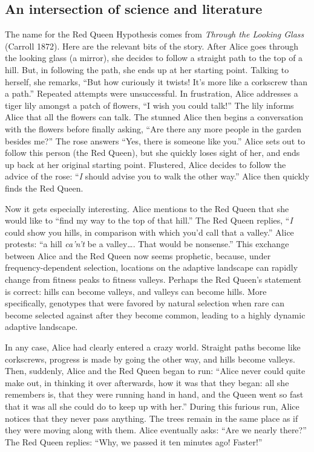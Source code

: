 \documentclass[
  letterpaper,
]{book}
\begin{document}
\subsection{An intersection of science and
literature}\label{an-intersection-of-science-and-literature}

The name for the Red Queen Hypothesis comes from \emph{Through the
Looking Glass} (Carroll 1872). Here are the relevant bits of the story.
After Alice goes through the looking glass (a mirror), she decides to
follow a straight path to the top of a hill. But, in following the path,
she ends up at her starting point. Talking to herself, she remarks,
``But how curiously it twists! It's more like a corkscrew than a path.''
Repeated attempts were unsuccessful. In frustration, Alice addresses a
tiger lily amongst a patch of flowers, ``I wish you could talk!'' The
lily informs Alice that all the flowers can talk. The stunned Alice then
begins a conversation with the flowers before finally asking, ``Are
there any more people in the garden besides me?'' The rose answers
``Yes, there is someone like you.'' Alice sets out to follow this person
(the Red Queen), but she quickly loses sight of her, and ends up back at
her original starting point. Flustered, Alice decides to follow the
advice of the rose: ``\emph{I} should advise you to walk the other
way.'' Alice then quickly finds the Red Queen.

Now it gets especially interesting. Alice mentions to the Red Queen that
she would like to ``find my way to the top of that hill.'' The Red Queen
replies, ``\emph{I} could show you hills, in comparison with which you'd
call that a valley.'' Alice protests: ``a hill \emph{ca'n't} be a
valley\ldots. That would be nonsense.'' This exchange between Alice and
the Red Queen now seems prophetic, because, under frequency-dependent
selection, locations on the adaptive landscape can rapidly change from
fitness peaks to fitness valleys. Perhaps the Red Queen's statement is
correct: hills can become valleys, and valleys can become hills. More
specifically, genotypes that were favored by natural selection when rare
can become selected against after they become common, leading to a
highly dynamic adaptive landscape.

In any case, Alice had clearly entered a crazy world. Straight paths
become like corkscrews, progress is made by going the other way, and
hills become valleys. Then, suddenly, Alice and the Red Queen began to
run: ``Alice never could quite make out, in thinking it over afterwards,
how it was that they began: all she remembers is, that they were running
hand in hand, and the Queen went so fast that it was all she could do to
keep up with her.'' During this furious run, Alice notices that they
never pass anything. The trees remain in the same place as if they were
moving along with them. Alice eventually asks: ``Are we nearly there?''
The Red Queen replies: ``Why, we passed it ten minutes ago! Faster!''
\end{document}
